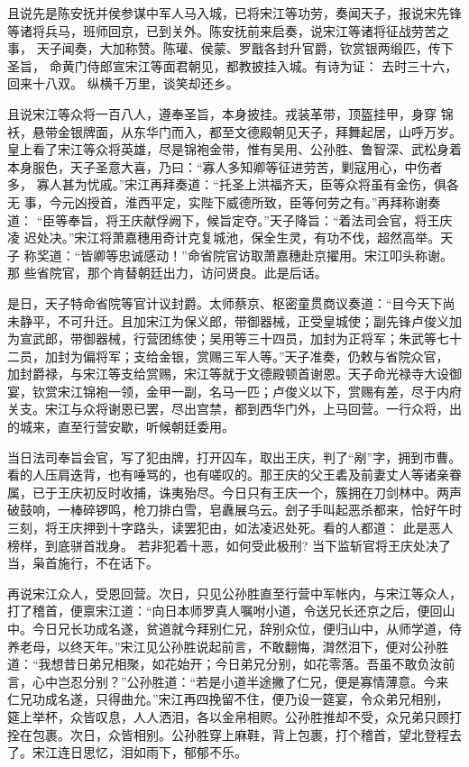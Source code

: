 且说先是陈安抚并侯参谋中军人马入城，已将宋江等功劳，奏闻天子，报说宋先锋
等诸将兵马，班师回京，已到关外。陈安抚前来启奏，说宋江等诸将征战劳苦之事，
天子闻奏，大加称赞。陈瓘、侯蒙、罗戬各封升官爵，钦赏银两缎匹，传下圣旨，
命黄门侍郎宣宋江等面君朝见，都教披挂入城。有诗为证：
去时三十六，回来十八双。
纵横千万里，谈笑却还乡。

且说宋江等众将一百八人，遵奉圣旨，本身披挂。戎装革带，顶盔挂甲，身穿
锦袄，悬带金银牌面，从东华门而入，都至文德殿朝见天子，拜舞起居，山呼万岁。
皇上看了宋江等众将英雄，尽是锦袍金带，惟有吴用、公孙胜、鲁智深、武松身着
本身服色，天子圣意大喜，乃曰：“寡人多知卿等征进劳苦，剿寇用心，中伤者多，
寡人甚为忧戚。”宋江再拜奏道：“托圣上洪福齐天，臣等众将虽有金伤，俱各无
事，今元凶授首，淮西平定，实陛下威德所致，臣等何劳之有。”再拜称谢奏道：
“臣等奉旨，将王庆献俘阙下，候旨定夺。”天子降旨：“着法司会官，将王庆凌
迟处决。”宋江将萧嘉穗用奇计克复城池，保全生灵，有功不伐，超然高举。天子
称奖道：“皆卿等忠诚感动！”命省院官访取萧嘉穗赴京擢用。宋江叩头称谢。那
些省院官，那个肯替朝廷出力，访问贤良。此是后话。

是日，天子特命省院等官计议封爵。太师蔡京、枢密童贯商议奏道：“目今天下尚
未静平，不可升迁。且加宋江为保义郎，带御器械，正受皇城使；副先锋卢俊义加
为宣武郎，带御器械，行营团练使；吴用等三十四员，加封为正将军；朱武等七十
二员，加封为偏将军；支给金银，赏赐三军人等。”天子准奏，仍敕与省院众官，
加封爵禄，与宋江等支给赏赐，宋江等就于文德殿顿首谢恩。天子命光禄寺大设御
宴，钦赏宋江锦袍一领，金甲一副，名马一匹；卢俊义以下，赏赐有差，尽于内府
关支。宋江与众将谢恩已罢，尽出宫禁，都到西华门外，上马回营。一行众将，出
的城来，直至行营安歇，听候朝廷委用。

当日法司奉旨会官，写了犯由牌，打开囚车，取出王庆，判了“剐”字，拥到市曹。
看的人压肩迭背，也有唾骂的，也有嗟叹的。那王庆的父王砉及前妻丈人等诸亲眷
属，已于王庆初反时收捕，诛夷殆尽。今日只有王庆一个，簇拥在刀剑林中。两声
破鼓响，一棒碎锣鸣，枪刀排白雪，皂纛展乌云。刽子手叫起恶杀都来，恰好午时
三刻，将王庆押到十字路头，读罢犯由，如法凌迟处死。看的人都道：
此是恶人榜样，到底骈首戕身。
若非犯着十恶，如何受此极刑?
当下监斩官将王庆处决了当，枭首施行，不在话下。

再说宋江众人，受恩回营。次日，只见公孙胜直至行营中军帐内，与宋江等众人，
打了稽首，便禀宋江道：“向日本师罗真人嘱咐小道，令送兄长还京之后，便回山
中。今日兄长功成名遂，贫道就今拜别仁兄，辞别众位，便归山中，从师学道，侍
养老母，以终天年。”宋江见公孙胜说起前言，不敢翻悔，潸然泪下，便对公孙胜
道：“我想昔日弟兄相聚，如花始开；今日弟兄分别，如花零落。吾虽不敢负汝前
言，心中岂忍分别？”公孙胜道：“若是小道半途撇了仁兄，便是寡情薄意。今来
仁兄功成名遂，只得曲允。”宋江再四挽留不住，便乃设一筵宴，令众弟兄相别，
筵上举杯，众皆叹息，人人洒泪，各以金帛相赆。公孙胜推却不受，众兄弟只顾打
拴在包裹。次日，众皆相别。公孙胜穿上麻鞋，背上包裹，打个稽首，望北登程去
了。宋江连日思忆，泪如雨下，郁郁不乐。

